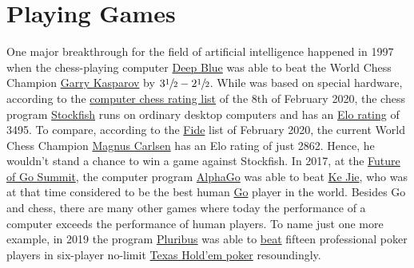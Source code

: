 \chapter{Playing Games}
One major breakthrough for the field of artificial intelligence happened in 1997 when the chess-playing computer
\href{https://en.wikipedia.org/wiki/Deep_Blue_(chess_computer)}{Deep Blue} was able to beat the World Chess
Champion \href{https://en.wikipedia.org/wiki/Garry_Kasparov}{Garry Kasparov} by $3\sfrac{1}{2}-2\sfrac{1}{2}$.
While   was based on special hardware, according to the
\href{http://www.computerchess.org.uk/ccrl/4040/rating_list_all.html}{computer chess rating list} of the 8th
of February 2020, the chess program \href{https://en.wikipedia.org/wiki/Stockfish_(chess)}{Stockfish} runs
on ordinary desktop computers and has an \href{https://en.wikipedia.org/wiki/Elo_rating_system}{Elo rating} of 3495.  
To compare, according to the
\href{https://ratings.fide.com/top.phtml?list=men}{Fide} list of February 2020, the current 
World Chess Champion \href{https://en.wikipedia.org/wiki/Magnus_Carlsen}{Magnus Carlsen} has an Elo rating of
just 2862.  Hence, he wouldn't stand a chance to win a game against Stockfish.  In 2017, at the 
\href{https://en.wikipedia.org/wiki/Future_of_Go_Summit}{Future of Go Summit},  the computer program
\href{https://en.wikipedia.org/wiki/AlphaGo}{AlphaGo}  was able to beat
\href{https://en.wikipedia.org/wiki/Ke_Jie}{Ke Jie},  
who was at that time considered to be the best human
\href{https://en.wikipedia.org/wiki/Go_(game)}{Go} player in the world. 
Besides Go and chess, there are many other games where today the performance of a computer exceeds the
performance of human players.  To name just one more example, in 2019 the program
\href{https://en.wikipedia.org/wiki/Pluribus_(poker_bot)}{Pluribus}  was able to  
\href{https://arstechnica.com/science/2019/07/facebook-ai-pluribus-defeats-top-poker-professionals-in-6-player-texas-holdem/}{beat}
fifteen professional poker players in six-player no-limit 
\href{https://en.wikipedia.org/wiki/Texas_hold_%27em}{Texas Hold'em poker} resoundingly.


